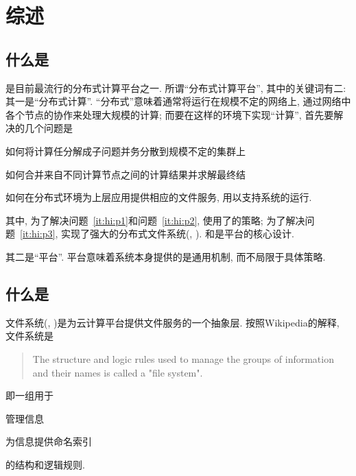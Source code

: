 \chapter{\HadoopFS 综述}
\label{ch:hfs-intro}


\section{什么是\Hadoop}
\label{ch:hfs-intro:hadoop}

\Hadoop 是目前最流行的分布式计算平台之一.
所谓``分布式计算平台'', 其中的关键词有二:
其一是``分布式计算''. ``分布式''意味着\Hadoop 通常将运行在规模不定的网络上,
通过网络中各个节点的协作来处理大规模的计算; 而要在这样的环境下实现``计算'',
首先要解决的几个问题是
\begin{XeEnum}
    \item\label{it:hi:p1} 如何将计算任分解成子问题并务分散到规模不定的集群上
    \item\label{it:hi:p2} 如何合并来自不同计算节点之间的计算结果并求解最终结
    \item\label{it:hi:p3} 如何在分布式环境为上层应用提供相应的文件服务, 用以支持\Hadoop 系统的运行.
\end{XeEnum}
其中, 为了解决问题~\ref{it:hi:p1}和问题~\ref{it:hi:p2},
\Hadoop 使用了\MapReduce 的策略;
为了解决问题~\ref{it:hi:p3}, \Hadoop 实现了强大的\Hadoop 分布式文件系统(\HadoopDFS, \HDFS).
\MapReduce 和\HDFS 是\Hadoop 平台的核心设计.

其二是``平台''. 平台意味着\Hadoop 系统本身提供的是通用机制, 而不局限于具体策略.

\section{什么是\HadoopFS}
\label{ch:hfs-intro:hfs}

\Hadoop 文件系统(\HadoopFS, \HFS)是为\Hadoop 云计算平台提供文件服务的一个抽象层.
按照Wikipedia的解释, 文件系统是
\begin{quote}
The structure and logic rules used to manage the groups of information and their names is called a "file system".
\end{quote}
即一组用于
\begin{XeEnum}
    \item 管理信息
    \item 为信息提供命名索引
\end{XeEnum}
的结构和逻辑规则.


